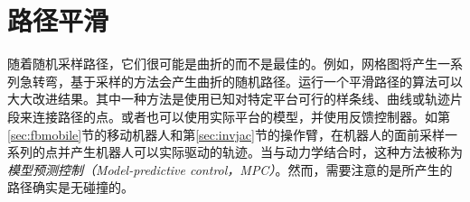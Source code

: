 \section{路径平滑}
随着随机采样路径，它们很可能是曲折的而不是最佳的。例如，网格图将产生一系列急转弯，基于采样的方法会产生曲折的随机路径。运行一个平滑路径的算法可以大大改进结果。其中一种方法是使用已知对特定平台可行的样条线、曲线或轨迹片段来连接路径的点。或者也可以使用实际平台的模型，并使用反馈控制器。如第\ref{sec:fbmobile}节的移动机器人和第\ref{sec:invjac}节的操作臂，在机器人的面前采样一系列的点并产生机器人可以实际驱动的轨迹。当与动力学结合时，这种方法被称为\emph{模型预测控制（Model-predictive control，MPC）}。然而，需要注意的是所产生的路径确实是无碰撞的。



